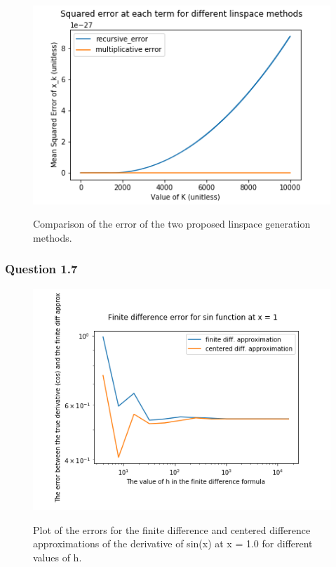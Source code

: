 \documentclass{article}
\begin{document}
\begin{figure}
	\includegraphics[width=\textwidth]{fig_ch1_cp1_6.png}
	\label{fig:ch1_cp1_6}
	\caption{Comparison of the error of the two proposed linspace generation 
	methods.}
\end{figure}

\subsubsection{Question 1.7}

\begin{figure}
	\includegraphics[width=\textwidth]{finite_diff_error_plot.png}
	\label{fig:ch1cp17}
	\caption{Plot of the errors for the finite difference and centered
	 difference approximations of the derivative of sin(x) at x = 1.0
	  for different values of h.}
\end{figure}
\end{document}
